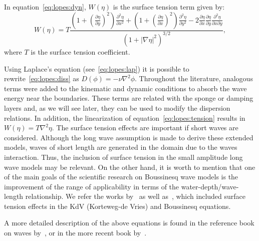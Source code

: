 In equation~\eqref{eq:lopes:dyn}, $W(\eta)$ is the surface
tension term given by:
\begin{equation}\label{eq:lopes:tension}
 \displaystyle W(\eta)=T\frac{\displaystyle
   \left(1+\left(\frac{\partial \eta}{\partial y}\right)^2\right)\frac{\partial ^2\eta}{\partial x^2}+
   \left(1+\left(\frac{\partial \eta}{\partial x}\right)^2\right)\frac{\partial ^2\eta}{\partial y^2}
   -2\frac{\partial \eta}{\partial x}\frac{\partial
     \eta}{\partial y}\frac{\partial ^2\eta}{\partial  x\partial y}}{(1+|\nabla\eta|^2)^{3/2}},
\end{equation}
where $T$ is the surface tension coefficient.

Using Laplace's equation (see~\eqref{eq:lopes:lap}) it
is possible to rewrite~\eqref{eq:lopes:diss} as
$D(\phi)=-\nu\nabla^2\phi$.  Throughout the literature,
analogous terms were added to the kinematic and dynamic
conditions to absorb the wave energy near the boundaries.
These terms are related with the sponge or damping layers
and, as we will see later, they can be used to modify the
dispersion relations.  In addition, the linearization of
equation~\eqref{eq:lopes:tension} results in
$W(\eta)=T\nabla^2\eta$.  The surface tension effects are
important if short waves are considered.  Although the long
wave assumption is made to derive these extended models,
waves of short length are generated in the domain due to the
waves interaction.  Thus, the inclusion of surface tension
in the small amplitude long wave models may be relevant.  On
the other hand, it is worth to mention that one of the main
goals of the scientific research on Boussinesq wave models
is the improvement of the range of applicability in terms of
the water-depth/wave-length relationship.  We refer the
works by~\cite{WangWuChengEtAl2008} as well
as~\cite{DashDaripa2002}, which included surface tension
effects in the KdV (Korteweg-de Vries) and Boussinesq
equations.

A more detailed description of the above equations is found
in the reference book on waves by~\cite{Whitham1974}, or in
the more recent book by~\cite{Johnson1997}.

